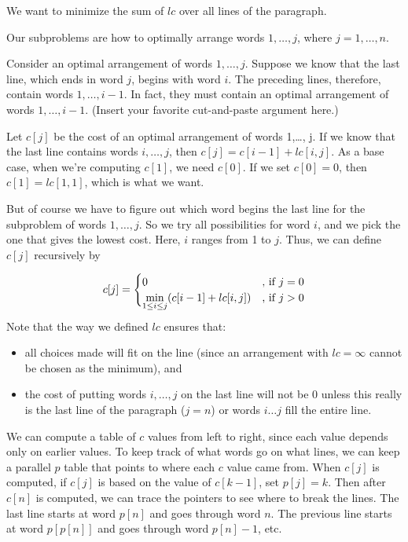 We want to minimize the sum of $lc$ over all lines of the paragraph.

Our subproblems are how to optimally arrange words $1, \ldots, j$, where $j = 1,\ldots, n$.

Consider an optimal arrangement of words $1,\ldots, j$. Suppose we know that the last line, which ends in word $j$, begins with word $i$. The preceding lines, therefore, contain words $1,\ldots,i - 1$. In fact, they must contain an optimal arrangement of words $1,\ldots,i - 1$. (Insert your favorite cut-and-paste argument here.)

Let $c[j]$ be the cost of an optimal arrangement of words 1,\ldots, j. If we know that the last line contains words $i,\ldots, j$, then $c[j] = c[i - 1] + lc[i, j]$. As a base case, when we're computing $c[1]$, we need $c[0]$. If we set $c[0] = 0$, then $c[1] = lc[1, 1]$, which is what we want.

But of course we have to figure out which word begins the last line for the subproblem of words $1,\ldots, j$. So we try all possibilities for word $i$, and we pick the one that gives the lowest cost. Here, $i$ ranges from 1 to $j$. Thus, we can define $c[j]$ recursively by

\begin{equation*}
    c[j] =
    \begin{cases}
        0 & \text{, if } j = 0 \\
        \smash{\displaystyle\min_{1 \leq i \leq j}} (c[i - 1] + lc[i, j]) & \text{, if } j > 0
    \end{cases}
\end{equation*}

Note that the way we defined $lc$ ensures that:

\begin{itemize}
\item all choices made will fit on the line (since an arrangement with $lc = \infty$ cannot be chosen as the minimum), and

\item the cost of putting words $i,\ldots, j$ on the last line will not be 0 unless this really is the last line of the paragraph ($j = n$) or words $i \ldots j$ fill the entire line.
\end{itemize}

We can compute a table of $c$ values from left to right, since each value depends only on earlier values. To keep track of what words go on what lines, we can keep a parallel $p$ table that points to where each $c$ value came from. When $c[j]$ is computed, if $c[j]$ is based on the value of $c[k - 1]$, set $p[j] = k$. Then after $c[n]$ is computed, we can trace the pointers to see where to break the lines. The last line starts at word $p[n]$ and goes through word $n$. The previous line starts at word $p[p[n]]$ and goes through word $p[n] - 1$, etc.

